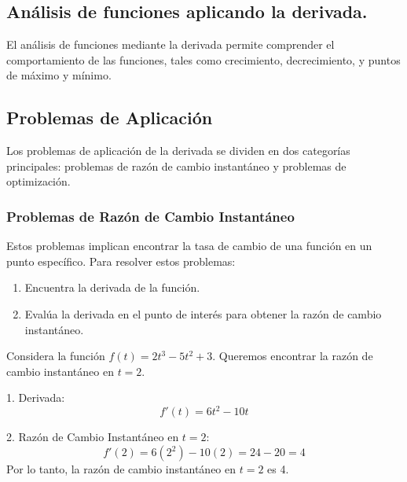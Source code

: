 \subsection{Análisis de funciones aplicando la derivada.}

El análisis de funciones mediante la derivada permite comprender el comportamiento de las funciones, tales como crecimiento, decrecimiento, y puntos de máximo y mínimo.

\subsection{Problemas de Aplicación}
Los problemas de aplicación de la derivada se dividen en dos categorías principales: problemas de razón de cambio instantáneo y problemas de optimización.

\subsubsection{Problemas de Razón de Cambio Instantáneo}
Estos problemas implican encontrar la tasa de cambio de una función en un punto específico. Para resolver estos problemas:

\begin{enumerate}
    \item Encuentra la derivada de la función.
    \item Evalúa la derivada en el punto de interés para obtener la razón de cambio instantáneo.
\end{enumerate}

\begin{example}
    Considera la función \( f(t) = 2t^3 - 5t^2 + 3 \). Queremos encontrar la razón de cambio instantáneo en \( t = 2 \).

1. Derivada:
   \[
   f'(t) = 6t^2 - 10t
   \]

2. Razón de Cambio Instantáneo en \( t = 2 \):
   \[
   f'(2) = 6(2^2) - 10(2) = 24 - 20 = 4
   \]
   Por lo tanto, la razón de cambio instantáneo en \( t = 2 \) es 4.
   \begin{center}
\end{center}
\end{example}

